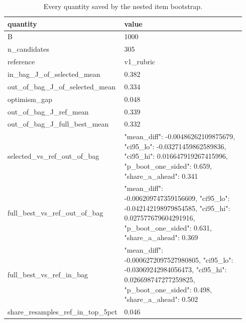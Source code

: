 \scriptsize
\setlength{\tabcolsep}{3pt}
\begin{longtable}{p{0.122\linewidth}p{0.820\linewidth}}
\caption{Every quantity saved by the nested item bootstrap.}\label{tab:nested_selection}\\
\toprule
quantity & value \\
\midrule
B & 1000 \\
n\_\allowbreak{}candidates & 305 \\
reference & v1\_\allowbreak{}rubric \\
in\_\allowbreak{}bag\_\allowbreak{}J\_\allowbreak{}of\_\allowbreak{}selected\_\allowbreak{}mean & 0.382 \\
out\_\allowbreak{}of\_\allowbreak{}bag\_\allowbreak{}J\_\allowbreak{}of\_\allowbreak{}selected\_\allowbreak{}mean & 0.334 \\
optimism\_\allowbreak{}gap & 0.048 \\
out\_\allowbreak{}of\_\allowbreak{}bag\_\allowbreak{}J\_\allowbreak{}ref\_\allowbreak{}mean & 0.339 \\
out\_\allowbreak{}of\_\allowbreak{}bag\_\allowbreak{}J\_\allowbreak{}full\_\allowbreak{}best\_\allowbreak{}mean & 0.332 \\
selected\_\allowbreak{}vs\_\allowbreak{}ref\_\allowbreak{}out\_\allowbreak{}of\_\allowbreak{}bag & {"mean\_\allowbreak{}diff": -0.00486262109875679, "ci95\_\allowbreak{}lo": -0.03271459862589836, "ci95\_\allowbreak{}hi": 0.016647919267415996, "p\_\allowbreak{}boot\_\allowbreak{}one\_\allowbreak{}sided": 0.659, "share\_\allowbreak{}a\_\allowbreak{}ahead": 0.341} \\
full\_\allowbreak{}best\_\allowbreak{}vs\_\allowbreak{}ref\_\allowbreak{}out\_\allowbreak{}of\_\allowbreak{}bag & {"mean\_\allowbreak{}diff": -0.006209747359156609, "ci95\_\allowbreak{}lo": -0.042142198979854585, "ci95\_\allowbreak{}hi": 0.027577679604291916, "p\_\allowbreak{}boot\_\allowbreak{}one\_\allowbreak{}sided": 0.631, "share\_\allowbreak{}a\_\allowbreak{}ahead": 0.369} \\
full\_\allowbreak{}best\_\allowbreak{}vs\_\allowbreak{}ref\_\allowbreak{}in\_\allowbreak{}bag & {"mean\_\allowbreak{}diff": -0.0006272097527980805, "ci95\_\allowbreak{}lo": -0.03069242984056473, "ci95\_\allowbreak{}hi": 0.026698747277259825, "p\_\allowbreak{}boot\_\allowbreak{}one\_\allowbreak{}sided": 0.498, "share\_\allowbreak{}a\_\allowbreak{}ahead": 0.502} \\
share\_\allowbreak{}resamples\_\allowbreak{}ref\_\allowbreak{}in\_\allowbreak{}top\_\allowbreak{}5pct & 0.046 \\

\end{longtable}
